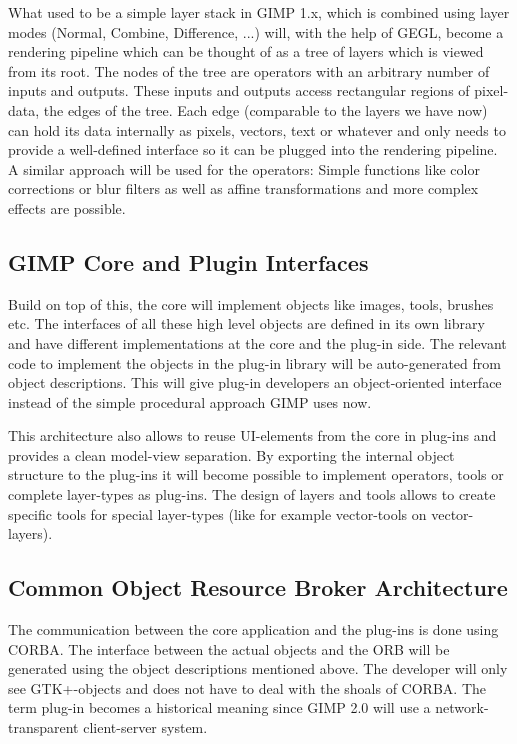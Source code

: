 What used to be a simple layer stack in GIMP 1.x, which is combined
using layer modes (Normal, Combine, Difference, ...) will, with the
help of GEGL, become a rendering pipeline which can be thought of as a
tree of layers which is viewed from its root. The nodes of the tree
are operators with an arbitrary number of inputs and outputs. These
inputs and outputs access rectangular regions of pixel-data, the edges
of the tree. Each edge (comparable to the layers we have now) can hold
its data internally as pixels, vectors, text or whatever and only
needs to provide a well-defined interface so it can be plugged into
the rendering pipeline. A similar approach will be used for the
operators: Simple functions like color corrections or blur filters as
well as affine transformations and more complex effects are possible.

\subsection{GIMP Core and Plugin Interfaces}

Build on top of this, the core will implement objects like images,
tools, brushes etc. The interfaces of all these high level objects are
defined in its own library and have different implementations at the
core and the plug-in side. The relevant code to implement the objects
in the plug-in library will be auto-generated from object
descriptions. This will give plug-in developers an object-oriented
interface instead of the simple procedural approach GIMP uses now.


This architecture also allows to reuse UI-elements from the core in
plug-ins and provides a clean model-view separation. By exporting the
internal object structure to the plug-ins it will become possible to
implement operators, tools or complete layer-types as plug-ins. The
design of layers and tools allows to create specific tools for special
layer-types (like for example vector-tools on vector-layers).

\subsection{Common Object Resource Broker Architecture}

The communication between the core application and the plug-ins is
done using CORBA. The interface between the actual objects and the ORB
will be generated using the object descriptions mentioned above. The
developer will only see GTK+-objects and does not have to deal with
the shoals of CORBA. The term plug-in becomes a historical meaning
since GIMP 2.0 will use a network-transparent client-server system.

